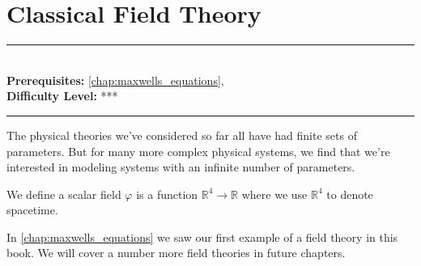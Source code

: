 \documentclass[book.tex]{subfiles}
\begin{document}
\chapter{Classical Field Theory}

\label{chap:classic_fields}
\noindent\rule{11cm}{0.4pt} \\
\textbf{Prerequisites:} \autoref{chap:maxwells_equations},  \\
\textbf{Difficulty Level:} *** \\
\noindent\rule{11cm}{0.4pt}
\vspace{5mm}

The physical theories we've considered so far all have had finite sets of parameters. But for many more complex physical systems, we find that we're interested in modeling systems with an infinite number of parameters. 

We define a scalar field $\varphi$ is a function $\mathbb{R}^4 \to \mathbb{R}$ where we use $\mathbb{R}^4$ to denote spacetime.

In \autoref{chap:maxwells_equations} we saw our first example of a field theory in this book. We will cover a number more field theories in future chapters.
\end{document}
